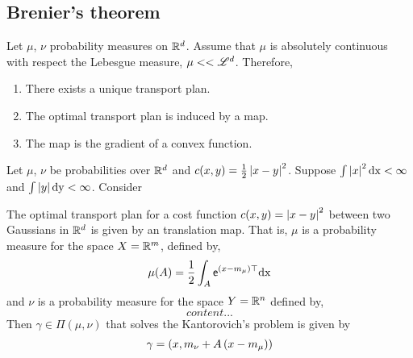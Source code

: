 \subsection{Brenier's theorem}

\begin{theorem}
	Let $\mu$, $\nu$ probability measures on $\mathbb{R}^d$. Assume that $\mu$ is absolutely continuous with respect the Lebesgue measure, $\mu<<\mathscr{L}^d$. Therefore,
	\begin{enumerate}
		\item There exists a unique transport plan.
		\item The optimal transport plan is induced by a map.
		\item The map is the gradient of a convex function. 
	\end{enumerate}
\end{theorem}

\begin{theorem}
	Let $\mu$, $\nu$  be probabilities over $\mathbb{R}^d$ and $c(x,y)=\frac{1}{2}\left| x-y \right|^2$. Suppose $\int \left| x \right|^2 \mathrm{dx} <\infty$ and $\int \left| y \right|\mathrm{dy}<\infty$. Consider
\end{theorem}


\begin{theorem}
	The optimal transport plan for a cost function $c(x,y)=\left| x-y \right|^2$ between two Gaussians in $\mathbb{R}^d$ is given by an translation map.
	That is, $\mu$ is a probability measure for the space $X=\mathbb{R}^m$, defined by,
	\begin{equation*}
	\mu(A)=\frac{1}{2}\int_{A} \mathsf{e}^{(x-m_\mu)\top}\mathrm{dx}	
	\end{equation*}
	and $\nu$ is a probability measure for the space $Y=\mathbb{R}^n$ defined by,
	\begin{equation*}
		content...
	\end{equation*} 
	Then $\gamma\in \Pi(\mu,\nu)$ that solves the Kantorovich's problem is given by 
	\begin{equation}
		\gamma=\left( x, m_\nu+A\left( x-m_\mu \right) \right)
	\end{equation}
\end{theorem}


